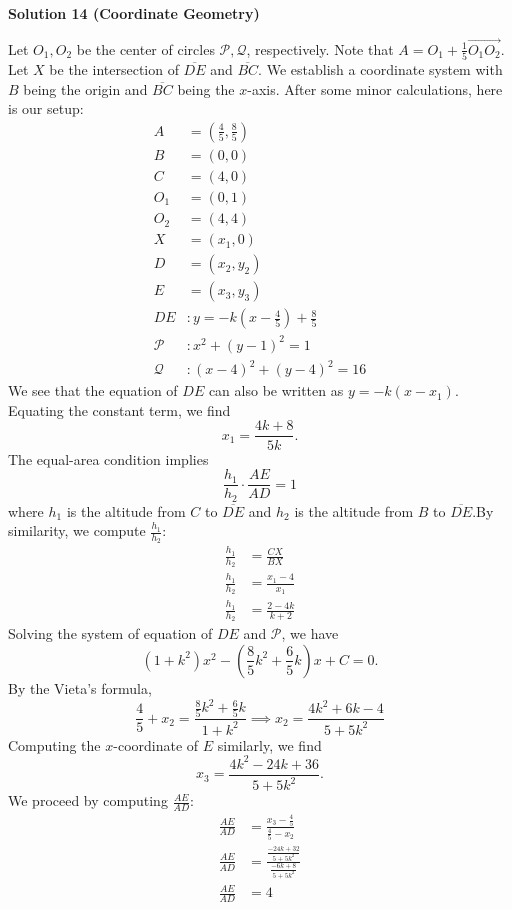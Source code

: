 \begin{enumerate}
\textbf{Solution 14 (Coordinate Geometry)}

Let $O_1, O_2$ be the center of circles $\mathcal{P},\mathcal{Q}$, respectively. Note that $A=O_1+\frac{1}{5}\overrightarrow{O_{1}O_{2}}$. Let $X$ be the intersection of $\overline{DE}$ and $\overline{BC}$. We establish a coordinate system with $B$ being the origin and $\overline{BC}$ being the $x$-axis. After some minor calculations, here is our setup:\begin{align*}A&=(\frac{4}{5},\frac{8}{5})\\B&=(0,0)\\C&=(4,0)\\O_1&=(0,1)\\O_2&=(4,4)\\X&=(x_1,0)\\D&=(x_2,y_2)\\E&=(x_3,y_3)\\DE&: y=-k(x-\frac{4}{5})+\frac{8}{5}\\\mathcal{P}&: x^2+(y-1)^2=1\\\mathcal{Q}&: (x-4)^2+(y-4)^2=16\end{align*}
We see that the equation of $DE$ can also be written as $y=-k(x-x_1)$. Equating the constant term, we find
 \[x_1=\frac{4k+8}{5k}.\]The equal-area condition implies\begin{equation}\frac{h_1}{h_2}\cdot \frac{AE}{AD}=1 \tag{1}\end{equation}where $h_1$ is the altitude from $C$ to $\overline{DE}$ and $h_2$ is the altitude from $B$ to $\overline{DE}$.By similarity, we compute $\frac{h_1}{h_2}$:\begin{align*}\frac{h_1}{h_2}&=\frac{CX}{BX}\\\frac{h_1}{h_2}&=\frac{x_{1}-4}{x_{1}}\\\frac{h_1}{h_2}&=\frac{2-4k}{k+2}\end{align*}
Solving the system of equation of $DE$ and $\mathcal{P}$, we have
 \[(1+k^2)x^2-(\frac{8}{5}k^2+\frac{6}{5}k)x+C=0.\]By the Vieta's formula,\begin{equation}\frac{4}{5}+x_2=\frac{\frac{8}{5}k^2+\frac{6}{5}k}{1+k^2}\implies x_2=\frac{4k^2+6k-4}{5+5k^2} \tag{2}\end{equation}Computing the $x$-coordinate of $E$ similarly, we find
 \[x_3=\frac{4k^2-24k+36}{5+5k^2}.\]We proceed by computing $\frac{AE}{AD}$:\begin{align*}\frac{AE}{AD}&=\frac{x_3-\frac{4}{5}}{\frac{4}{5}-x_2}\\\frac{AE}{AD}&=\frac{\frac{-24k+32}{5+5k^2}}{\frac{-6k+8}{5+5k^2}}\\\frac{AE}{AD}&=4\end{align*}

\end{enumerate}
